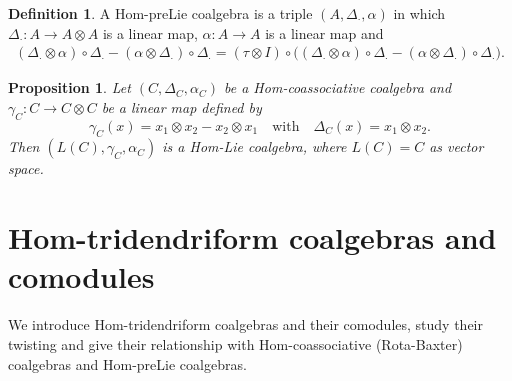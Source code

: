 \documentclass{article}
\newtheorem{prop}[thm]{Proposition}
\theoremstyle{definition}
\newtheorem{defn}[thm]{Definition}
\theoremstyle{remark}
\numberwithin{equation}{section}
\begin{document}
\begin{defn}
 A Hom-preLie coalgebra is a triple $(A, \Delta_\cdot, \alpha)$ in which $\Delta_\cdot :  A\rightarrow A\otimes A$ is a linear map, $\alpha : A\rightarrow A$
 is a linear map and
\begin{eqnarray}
(\Delta_\cdot\otimes\alpha)\circ\Delta_\cdot-(\alpha\otimes\Delta_\cdot)\circ\Delta_\cdot=(\tau\otimes I)\circ\Big((\Delta_\cdot\otimes\alpha)\circ\Delta_\cdot-(\alpha\otimes\Delta_\cdot)\circ\Delta_\cdot\Big).
\end{eqnarray}
\end{defn}
\begin{prop}\cite{IB}
 Let $(C, \Delta_C, \alpha_C)$ be a Hom-coassociative coalgebra and
$\gamma_C: C\longrightarrow C\otimes C$ be a linear map defined by
$$\gamma_C(x)=x_1\otimes x_2-x_2\otimes x_1\quad \mbox{with}\quad \Delta_C(x)=x_1\otimes x_2.$$
Then $(L(C), \gamma_C, \alpha_C)$ is a Hom-Lie coalgebra, where $L(C)=C$ as vector space.
\end{prop}
\section{Hom-tridendriform coalgebras and comodules}
 We introduce Hom-tridendriform coalgebras and their comodules, study their twisting and give their relationship with
 Hom-coassociative (Rota-Baxter) coalgebras and Hom-preLie coalgebras.
\end{document}
